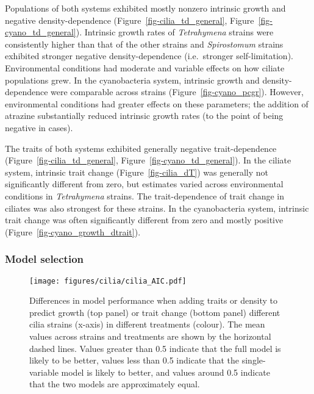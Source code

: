 \documentclass[
  letterpaper,
  DIV=11,
  numbers=noendperiod]{scrartcl}
\begin{document}
Populations of both systems exhibited mostly nonzero intrinsic growth
and negative density-dependence (Figure~\ref{fig-cilia_td_general},
Figure~\ref{fig-cyano_td_general}). Intrinsic growth rates of
\emph{Tetrahymena} strains were consistently higher than that of the
other strains and \emph{Spirostomum} strains exhibited stronger negative
density-dependence (i.e.~stronger self-limitation). Environmental
conditions had moderate and variable effects on how ciliate populations
grew. In the cyanobacteria system, intrinsic growth and
density-dependence were comparable across strains
(Figure~\ref{fig-cyano_pcgr}). However, environmental conditions had
greater effects on these parameters; the addition of atrazine
substantially reduced intrinsic growth rates (to the point of being
negative in cases).

The traits of both systems exhibited generally negative trait-dependence
(Figure~\ref{fig-cilia_td_general}, Figure~\ref{fig-cyano_td_general}).
In the ciliate system, intrinsic trait change
(Figure~\ref{fig-cilia_dT}) was generally not significantly different
from zero, but estimates varied across environmental conditions in
\emph{Tetrahymena} strains. The trait-dependence of trait change in
ciliates was also strongest for these strains. In the cyanobacteria
system, intrinsic trait change was often significantly different from
zero and mostly positive (Figure~\ref{fig-cyano_growth_dtrait}).

\subsubsection{Model selection}\label{model-selection}

\begin{figure}

{\centering \texttt{[image: figures/cilia/cilia\_AIC.pdf]}

}

\caption{\label{fig-cilia_AIC}Differences in model performance when
adding traits or density to predict growth (top panel) or trait change
(bottom panel) different cilia strains (x-axis) in different treatments
(colour). The mean values across strains and treatments are shown by the
horizontal dashed lines. Values greater than 0.5 indicate that the full
model is likely to be better, values less than 0.5 indicate that the
single-variable model is likely to better, and values around 0.5
indicate that the two models are approximately equal.}

\end{figure}
\end{document}
